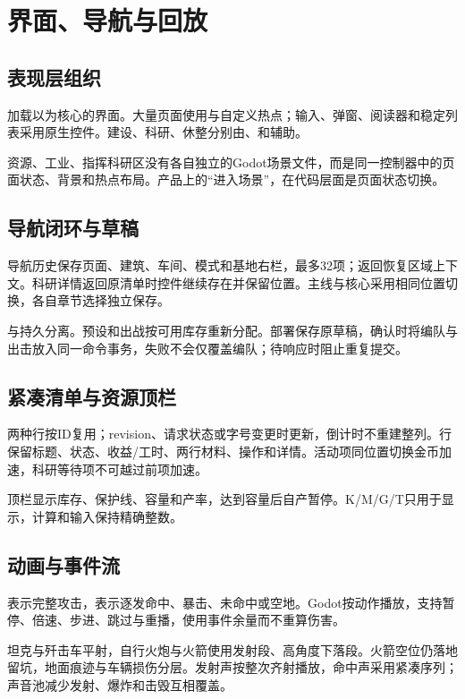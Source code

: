 \chapter{界面、导航与回放}
\section{表现层组织}
加载以为核心的界面。大量页面使用与自定义热点；输入、弹窗、阅读器和稳定列表采用原生控件。建设、科研、休整分别由、和辅助。

资源、工业、指挥科研区没有各自独立的Godot场景文件，而是同一控制器中的页面状态、背景和热点布局。产品上的“进入场景”，在代码层面是页面状态切换。

\section{导航闭环与草稿}
导航历史保存页面、建筑、车间、模式和基地右栏，最多32项；返回恢复区域上下文。科研详情返回原清单时控件继续存在并保留位置。主线与核心采用相同位置切换，各自章节选择独立保存。

与持久分离。预设和出战按可用库存重新分配。部署保存原草稿，确认时将编队与出击放入同一命令事务，失败不会仅覆盖编队；待响应时阻止重复提交。

\section{紧凑清单与资源顶栏}
两种行按ID复用；revision、请求状态或字号变更时更新，倒计时不重建整列。行保留标题、状态、收益/工时、两行材料、操作和详情。活动项同位置切换金币加速，科研等待项不可越过前项加速。

顶栏显示库存、保护线、容量和产率，达到容量后自产暂停。K/M/G/T只用于显示，计算和输入保持精确整数。

\section{动画与事件流}
表示完整攻击，表示逐发命中、暴击、未命中或空地。Godot按动作播放，支持暂停、倍速、步进、跳过与重播，使用事件余量而不重算伤害。

坦克与歼击车平射，自行火炮与火箭使用发射段、高角度下落段。火箭空位仍落地留坑，地面痕迹与车辆损伤分层。发射声按整次齐射播放，命中声采用紧凑序列；声音池减少发射、爆炸和击毁互相覆盖。

